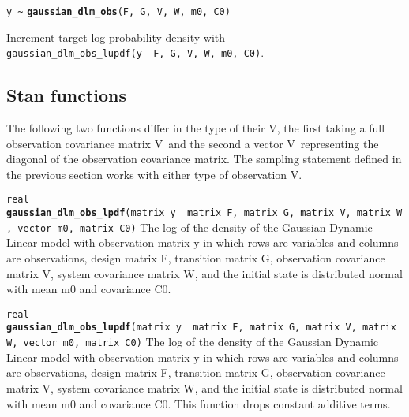 \documentclass[
  10pt,
]{book}
\begin{document}
\texttt{y\ \textasciitilde{}} \textbf{\texttt{gaussian\_dlm\_obs}}\texttt{(F,\ G,\ V,\ W,\ m0,\ C0)}

Increment target log probability density with \texttt{gaussian\_dlm\_obs\_lupdf(y\ \textbar{}\ F,\ G,\ V,\ W,\ m0,\ C0)}.

\hypertarget{stan-functions-54}{%
\subsection{Stan functions}\label{stan-functions-54}}

The following two functions differ in the type of their V, the first
taking a full observation covariance matrix V~and the second a vector
V~representing the diagonal of the observation covariance matrix.
The sampling statement defined in the previous section works with
either type of observation V.


\texttt{real} \textbf{\texttt{gaussian\_dlm\_obs\_lpdf}}\texttt{(matrix\ y\ \textbar{}\ matrix\ F,\ matrix\ G,\ matrix\ V,\ matrix\ W,\ vector\ m0,\ matrix\ C0)}\newline
The log of the density of the Gaussian Dynamic Linear model with
observation matrix y in which rows are variables and columns are
observations, design matrix F, transition matrix G, observation
covariance matrix V, system covariance matrix W, and the initial state
is distributed normal with mean m0 and covariance C0.


\texttt{real} \textbf{\texttt{gaussian\_dlm\_obs\_lupdf}}\texttt{(matrix\ y\ \textbar{}\ matrix\ F,\ matrix\ G,\ matrix\ V,\ matrix\ W,\ vector\ m0,\ matrix\ C0)}\newline
The log of the density of the Gaussian Dynamic Linear model with
observation matrix y in which rows are variables and columns are
observations, design matrix F, transition matrix G, observation
covariance matrix V, system covariance matrix W, and the initial state
is distributed normal with mean m0 and covariance C0. This function drops
constant additive terms.

\end{document}
